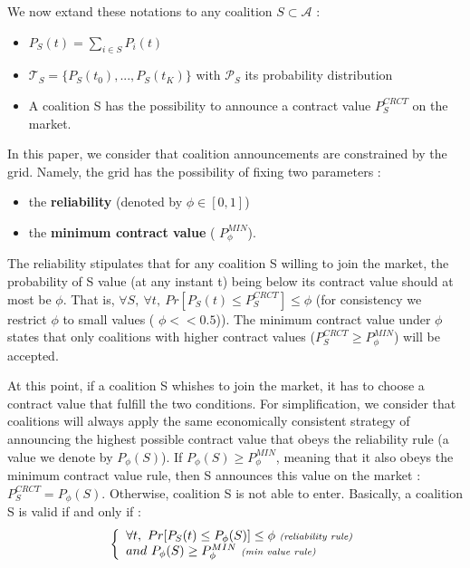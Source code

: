 \documentclass[conference]{IEEEtran}
\begin{document}
We now extand these notations to any coalition $ S \subset \mathcal{A} $ : 
\begin{itemize}
\item $ P_{S}(t) = \sum_{i \in S} P_{i}(t) $
\item $ \mathcal{T}_{S} = \{ P_{S}(t_{0}),...,P_{S}(t_{K}) \} $ with $ \mathcal{P}_{S} $ its probability distribution
\item A coalition S has the possibility to announce a contract value $ P_{S}^{CRCT} $ on the market.
\end{itemize}

In this paper, we consider that coalition announcements are constrained by the grid. Namely, the grid has the possibility of fixing two parameters : 

\begin{itemize}
\item the \textbf{reliability} (denoted by $ \phi \in [0,1] $)
\item the \textbf{minimum contract value} ( $ P_{\phi}^{MIN} $). 
\end{itemize}

The reliability stipulates that for any coalition S willing to join the market, the probability of S value (at any instant t) being below its contract value should at most be $ \phi $. That is, $ \forall S,\ \forall t,\ Pr[P_{S}(t) \leq P_{S}^{CRCT} ] \leq \phi $ (for consistency we restrict $ \phi $ to small values ( $ \phi << 0.5 $)). The minimum contract value under $ \phi $ states that only coalitions with higher contract values ($ P_{S}^{CRCT} \geq P_{\phi}^{MIN} $) will be accepted.

At this point, if a coalition S whishes to join the market, it has to choose a contract value that fulfill the two conditions. For simplification, we consider that coalitions will always apply the same economically consistent strategy of announcing the highest possible contract value that obeys the reliability rule (a value we denote by $ P_{\phi}(S) $). If $ P_{\phi}(S) \geq P_{\phi}^{MIN} $, meaning that it also obeys the minimum contract value rule, then S announces this value on the market : $ P_{S}^{CRCT} = P_{\phi}(S) $. Otherwise, coalition S is not able to enter.
Basically, a coalition S is valid if and only if :
\begin{equation}
\left\{ \begin{array}{lll}
		\forall t,\ Pr[ P_{S}(t) \leq P_{\phi}(S)] \leq \phi\ \textit{{\scriptsize (reliability rule)}} \\
		and\ P_{\phi}(S) \geq P_{\phi}^{MIN}\ \textit{{\scriptsize (min value rule)}}

\end{array} \right. 
\label{rules}
\end{equation}
\end{document}
